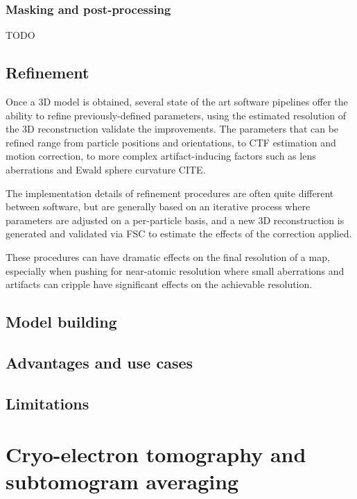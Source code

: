 \subsubsection{Masking and post-processing}
TODO

\subsection{Refinement}\label{refinement}

Once a 3D model is obtained, several state of the art software pipelines offer the ability to refine previously-defined parameters, using the estimated resolution of the 3D reconstruction validate the improvements.
The parameters that can be refined range from particle positions and orientations, to CTF estimation and motion correction, to more complex artifact-inducing factors such as lens aberrations and Ewald sphere curvature CITE.

The implementation details of refinement procedures are often quite different between software, but are generally based on an iterative process where parameters are adjusted on a per-particle basis, and a new 3D reconstruction is generated and validated via FSC to estimate the effects of the correction applied.

These procedures can have dramatic effects on the final resolution of a map, especially when pushing for near-atomic resolution where small aberrations and artifacts can cripple have significant effects on the achievable resolution.

\subsection{Model building}



\subsection{Advantages and use cases}

\subsection{Limitations}


\section[Cryo-ET and STA]{Cryo-electron tomography and subtomogram averaging}

